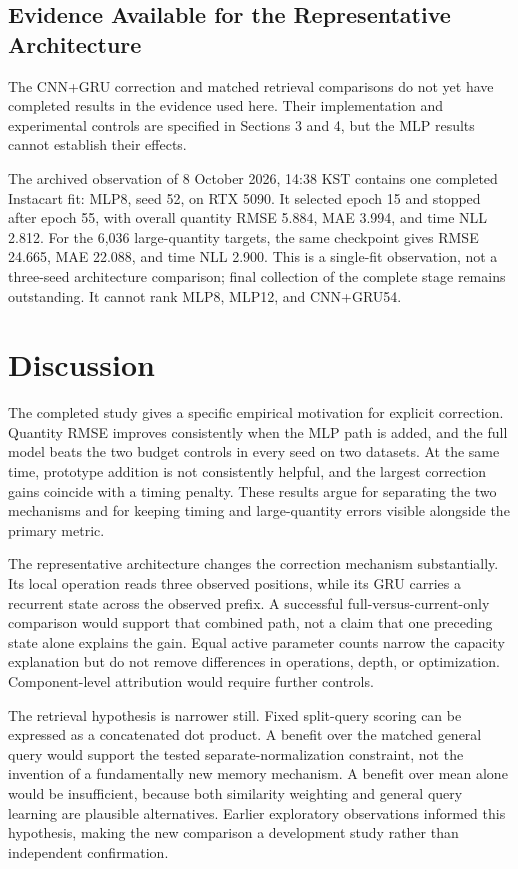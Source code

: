\documentclass[runningheads]{llncs}
\begin{document}
\subsection{Evidence Available for the Representative Architecture}
The CNN+GRU correction and matched retrieval comparisons do not yet have completed results in the evidence used here. Their implementation and experimental controls are specified in Sections 3 and 4, but the MLP results cannot establish their effects.

The archived observation of 8 October 2026, 14:38 KST contains one completed Instacart fit: MLP8, seed 52, on RTX 5090. It selected epoch 15 and stopped after epoch 55, with overall quantity RMSE 5.884, MAE 3.994, and time NLL 2.812. For the 6,036 large-quantity targets, the same checkpoint gives RMSE 24.665, MAE 22.088, and time NLL 2.900. This is a single-fit observation, not a three-seed architecture comparison; final collection of the complete stage remains outstanding. It cannot rank MLP8, MLP12, and CNN+GRU54.

\section{Discussion}
The completed study gives a specific empirical motivation for explicit correction. Quantity RMSE improves consistently when the MLP path is added, and the full model beats the two budget controls in every seed on two datasets. At the same time, prototype addition is not consistently helpful, and the largest correction gains coincide with a timing penalty. These results argue for separating the two mechanisms and for keeping timing and large-quantity errors visible alongside the primary metric.

The representative architecture changes the correction mechanism substantially. Its local operation reads three observed positions, while its GRU carries a recurrent state across the observed prefix. A successful full-versus-current-only comparison would support that combined path, not a claim that one preceding state alone explains the gain. Equal active parameter counts narrow the capacity explanation but do not remove differences in operations, depth, or optimization. Component-level attribution would require further controls.

The retrieval hypothesis is narrower still. Fixed split-query scoring can be expressed as a concatenated dot product. A benefit over the matched general query would support the tested separate-normalization constraint, not the invention of a fundamentally new memory mechanism. A benefit over mean alone would be insufficient, because both similarity weighting and general query learning are plausible alternatives. Earlier exploratory observations informed this hypothesis, making the new comparison a development study rather than independent confirmation.
\end{document}

